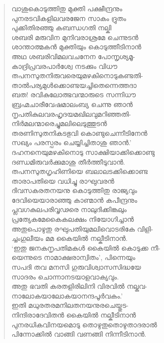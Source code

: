 \begin{verse}
വാശുകൊടുത്തിതു മുക്തി പക്ഷീന്ദ്രനും\\
പുനരടവികളിലവരജേന സാകം ദ്രുതം\\
പുക്കിതിരഞ്ഞു കബന്ധഗതി നല്കി\\
ശബരി മരുവിന മുനിവരാശ്രമേ ചെന്നുടന്‍\\
ശാന്താത്മകന്‍ മുക്തിയും കൊടുത്തീടിനാന്‍\\
അഥ ശബരിവിമലവചനേന പോന്നൃശ്യമൂ-\\
കാദ്രിപ്രവരപാര്‍ശ്വേ നടക്കും വിധൗ\\
തപനസുതനിരുവരെയുമഴകിനൊടുകണ്ടതി-\\
താല്‍പര്യമുള്‍ക്കൊണ്ടയച്ചിതെന്നെത്തദാ\\
ബത! രവികുലോത്ഭവന്മാരുടെ സന്നിധൗ\\
ബ്രഹ്മചാരീവേഷമാലംബ്യ ചെന്നു ഞാന്‍\\
നൃപതികുലവരഹൃദയമഖിലവുമറിഞ്ഞതി-\\
നിര്‍മലന്മാരെച്ചുമലിലെടുത്തുടന്‍\\
തരണിസുതനികടഭുവി കൊണ്ടുചെന്നീടിനേന്‍\\
സഖ്യം പരസ്പരം ചെയ്യിച്ചിതാശു ഞാന്‍.’\\
ദഹനനെയുമഴകിനൊടു സാക്ഷിയാക്കിക്കൊണ്ടു\\
ദണ്ഡമിരുവര്‍ക്കുമാശു തീര്‍ത്തീടുവാന്‍.\\
തപനസുതഗൃഹിണിയെ ബലാലടക്കിക്കൊണ്ട\\
താരാപതിയെ വധിച്ചു രാഘുവരന്‍\\
ദിവസകരതനയനു കൊടുത്തിതു രാജ്യവും\\
ദേവിയെയാരാഞ്ഞു കാണ്മാന്‍ കപീന്ദ്രനും\\
പ്ലവഗകുലപരിവൃഢരെ നാലുദിക്കിങ്കലും\\
പ്രത്യേകമേകൈകലക്ഷം നിയോഗിച്ചാന്‍\\
അതുപൊഴുതു രഘുപതിയുമലിവൊടരികേ വിളി-\\
ച്ചംഗുലീയം മമ കൈയില്‍ നല്കീടിനാന്‍.\\
‘ഇതു ജനകനൃപതിമകള്‍ കൈയില്‍ കൊടുക്ക നീ-\\
യെന്നുടെ നാമാക്ഷരാന്വിതം’, പിന്നെയും\\
സപദി തവ മനസി ഗുരുവിശ്വാസസിദ്ധയേ\\
സാദരം ചൊന്നാനടയാളവാക്യവും.\\
അതു ഭവതി കരതളിരിലിനി വിരവില്‍ നല്കുവ-\\
നാലോകയാലോകയാനന്ദപൂര്‍വകം.’\\
ഇതി മധുരതരമനിലതനയനുരചെയ്തുട-\\
നിന്ദിരാദേവിതന്‍ കൈയില്‍ നല്കീടിനാന്‍\\
പുനരധികവിനയമൊടു തൊഴുതുതൊഴുതാദരാല്‍\\
പിന്നോക്കില്‍ വാങ്ങി വണങ്ങി നിന്നീടിനാന്‍.\\

\end{verse}

